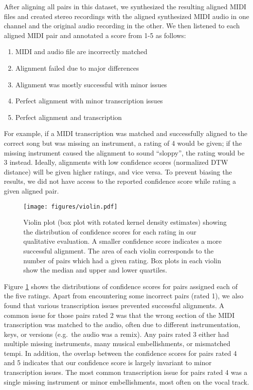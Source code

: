 After aligning all pairs in this dataset, we synthesized the resulting aligned MIDI files and created stereo recordings with the aligned synthesized MIDI audio in one channel and the original audio recording in the other.
We then listened to each aligned MIDI pair and annotated a score from 1-5 as follows:
\begin{enumerate}
\item MIDI and audio file are incorrectly matched
\item Alignment failed due to major differences
\item Alignment was mostly successful with minor issues
\item Perfect alignment with minor transcription issues
\item Perfect alignment and transcription
\end{enumerate}
For example, if a MIDI transcription was matched and successfully aligned to the correct song but was missing an instrument, a rating of 4 would be given; if the missing instrument caused the alignment to sound ``sloppy'', the rating would be 3 instead.
Ideally, alignments with low confidence scores (normalized DTW distance) will be given higher ratings, and vice versa.
To prevent biasing the results, we did not have access to the reported confidence score while rating a given aligned pair.

\begin{figure}[t]
  \centering
  \texttt{[image: figures/violin.pdf]}
  \caption{Violin plot (box plot with rotated kernel density estimates) showing the distribution of confidence scores for each rating in our qualitative evaluation.
A smaller confidence score indicates a more successful alignment.
The area of each violin corresponds to the number of pairs which had a given rating.
Box plots in each violin show the median and upper and lower quartiles.}
  \label{fig:violin}
\end{figure}

Figure \ref{fig:violin} shows the distributions of confidence scores for pairs assigned each of the five ratings.
Apart from encountering some incorrect pairs (rated 1), we also found that various transcription issues prevented successful alignments.
A common issue for those pairs rated 2 was that the wrong section of the MIDI transcription was  matched to the audio, often due to different instrumentation, keys, or versions (e.g.\ the audio was a remix).
Any pairs rated 3 either had multiple missing instruments, many musical embellishments, or mismatched tempi.
In addition, the overlap between the confidence scores for pairs rated 4 and 5 indicates that our confidence score is largely invariant to minor transcription issues.
The most common transcription issue for pairs rated 4 was a single missing instrument or minor embellishments, most often on the vocal track.

